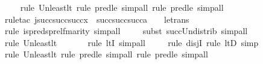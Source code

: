 \begin{isabellebody}
\ \ \ \isamarkupfalse%
{\isacharparenleft}{\kern0pt}rule\ Un{\isacharunderscore}{\kern0pt}least{\isacharunderscore}{\kern0pt}lt{\isacharcomma}{\kern0pt}\ rule\ pred{\isacharunderscore}{\kern0pt}le{\isacharcomma}{\kern0pt}\ simp{\isacharunderscore}{\kern0pt}all{\isacharcomma}{\kern0pt}\ rule\ pred{\isacharunderscore}{\kern0pt}le{\isacharcomma}{\kern0pt}\ simp{\isacharunderscore}{\kern0pt}all{\isacharparenright}{\kern0pt}\isanewline
\ \ \ \ \isamarkupfalse%
{\isacharparenleft}{\kern0pt}rule{\isacharunderscore}{\kern0pt}tac\ j{\isacharequal}{\kern0pt}{\isachardoublequoteopen}succ{\isacharparenleft}{\kern0pt}succ{\isacharparenleft}{\kern0pt}succ{\isacharparenleft}{\kern0pt}x{\isacharparenright}{\kern0pt}{\isacharparenright}{\kern0pt}{\isacharparenright}{\kern0pt}\ {\isasymunion}\ succ{\isacharparenleft}{\kern0pt}succ{\isacharparenleft}{\kern0pt}succ{\isacharparenleft}{\kern0pt}a{\isacharparenright}{\kern0pt}{\isacharparenright}{\kern0pt}{\isacharparenright}{\kern0pt}\ {\isasymunion}\ {}{\isachardoublequoteclose}\ \ le{\isacharunderscore}{\kern0pt}trans{\isacharparenright}{\kern0pt}\isanewline
\ \ \ \ \ \isamarkupfalse%
{\isacharparenleft}{\kern0pt}rule\ is{\isacharunderscore}{\kern0pt}preds{\isacharunderscore}{\kern0pt}prel{\isacharunderscore}{\kern0pt}fm{\isacharunderscore}{\kern0pt}arity{\isacharcomma}{\kern0pt}\ simp{\isacharunderscore}{\kern0pt}all{\isacharparenright}{\kern0pt}\isanewline
\ \ \ \ \isamarkupfalse%
{\isacharparenleft}{\kern0pt}subst\ succ{\isacharunderscore}{\kern0pt}Un{\isacharunderscore}{\kern0pt}distrib{\isacharcomma}{\kern0pt}\ simp{\isacharunderscore}{\kern0pt}all{\isacharparenright}{\kern0pt}{\isacharplus}{\kern0pt}\isanewline
\ \ \ \ \isamarkupfalse%
{\isacharparenleft}{\kern0pt}rule\ Un{\isacharunderscore}{\kern0pt}least{\isacharunderscore}{\kern0pt}lt{\isacharparenright}{\kern0pt}{\isacharplus}{\kern0pt}\isanewline
\ \ \ \ \ \ \isamarkupfalse%
{\isacharparenleft}{\kern0pt}rule\ ltI{\isacharcomma}{\kern0pt}\ simp{\isacharunderscore}{\kern0pt}all{\isacharparenright}{\kern0pt}{\isacharplus}{\kern0pt}\isanewline
\ \ \ \ \isamarkupfalse%
{\isacharparenleft}{\kern0pt}rule\ disjI{}{\isacharcomma}{\kern0pt}\ rule\ ltD{\isacharcomma}{\kern0pt}\ simp{\isacharparenright}{\kern0pt}\isanewline
\ \ \ \isamarkupfalse%
{\isacharparenleft}{\kern0pt}rule\ Un{\isacharunderscore}{\kern0pt}least{\isacharunderscore}{\kern0pt}lt{\isacharcomma}{\kern0pt}\ rule\ pred{\isacharunderscore}{\kern0pt}le{\isacharcomma}{\kern0pt}\ simp{\isacharunderscore}{\kern0pt}all{\isacharcomma}{\kern0pt}\ rule\ pred{\isacharunderscore}{\kern0pt}le{\isacharcomma}{\kern0pt}\ simp{\isacharunderscore}{\kern0pt}all{\isacharparenright}{\kern0pt}\isanewline

\end{isabellebody}
